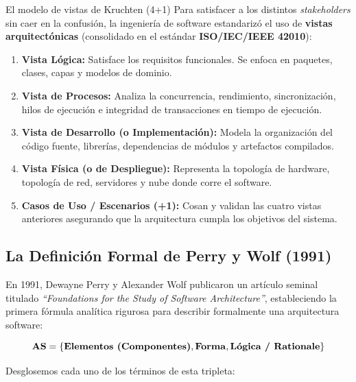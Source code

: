 \begin{importante}{El modelo de vistas de Kruchten (4+1)}
Para satisfacer a los distintos \emph{stakeholders} sin caer en la confusión, la ingeniería de software estandarizó el uso de \textbf{vistas arquitectónicas} (consolidado en el estándar \textbf{ISO/IEC/IEEE 42010}):
\begin{enumerate}[leftmargin=1.5em]
  \item \textbf{Vista Lógica:} Satisface los requisitos funcionales. Se enfoca en paquetes, clases, capas y modelos de dominio.
  \item \textbf{Vista de Procesos:} Analiza la concurrencia, rendimiento, sincronización, hilos de ejecución e integridad de transacciones en tiempo de ejecución.
  \item \textbf{Vista de Desarrollo (o Implementación):} Modela la organización del código fuente, librerías, dependencias de módulos y artefactos compilados.
  \item \textbf{Vista Física (o de Despliegue):} Representa la topología de hardware, topología de red, servidores y nube donde corre el software.
  \item \textbf{Casos de Uso / Escenarios (+1):} Cosan y validan las cuatro vistas anteriores asegurando que la arquitectura cumpla los objetivos del sistema.
\end{enumerate}
\end{importante}

\subsection{La Definición Formal de Perry y Wolf (1991)}

En 1991, Dewayne Perry y Alexander Wolf publicaron un artículo seminal titulado \emph{``Foundations for the Study of Software Architecture''}, estableciendo la primera fórmula analítica rigurosa para describir formalmente una arquitectura software:

\begin{equation}
\mathbf{AS} = \{\text{\textbf{Elementos (Componentes)}}, \text{\textbf{Forma}}, \text{\textbf{Lógica / Rationale}}\}
\end{equation}

Desglosemos cada uno de los términos de esta tripleta:

